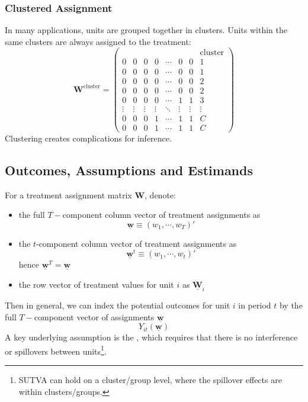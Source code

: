 \documentclass[twoside]{article}
\begin{document}
\subsubsection{Clustered Assignment}
In many applications, units are grouped together in clusters. Units within the same clusters are always assigned to the treatment:
\begin{equation*}
    \mathbf{W}^{\text{cluster}} = \begin{pmatrix}
        &&&&&&&\text{cluster}\\
        0&0&0&0&\cdots &0&0&1\\
        0&0&0&0&\cdots &0&0&1\\
        0&0&0&0&\cdots &0&0&2\\
        0&0&0&0&\cdots &0&0&2\\
        0&0&0&0&\cdots &1&1&3\\
        \vdots&\vdots&\vdots&\vdots&\ddots &\vdots&\vdots&\vdots\\
        0&0&0&1&\cdots &1&1&C\\
        0&0&0&1&\cdots &1&1&C
    \end{pmatrix}
\end{equation*}
Clustering creates complications for inference.

\subsection{Outcomes, Assumptions and Estimands}
For a treatment assignment matrix $\mathbf{W}$, denote:
\begin{itemize}
    \item the full $T-$component column vector of treatment assignments as $$ \underline{\mathbf{w}} \equiv \left(w_1,\cdots,w_T\right)' $$
    \item the $t$-component column vector of treatment assignments  as $$ \underline{\mathbf{w}}^{t} \equiv \left(w_1,\cdots,w_t\right)' $$ hence $\underline{\mathbf{w}}^T=\underline{\mathbf{w}}$
    \item the row vector of treatment values for unit $i$ as $\underline{\mathbf{W}}_i$
\end{itemize}
Then in general, we can index the potential outcomes for unit $i$ in period $t$ by the full $T-$component vector of assignments $\underline{\mathbf{w}}$
$$Y_{it}\left(\underline{\mathbf{w}}\right)$$
A key underlying assumption is the , which requires that there is no interference or spillovers between units\footnote{SUTVA can hold on a cluster/group level, where the spillover effects are within clusters/groups.}.
\end{document}
